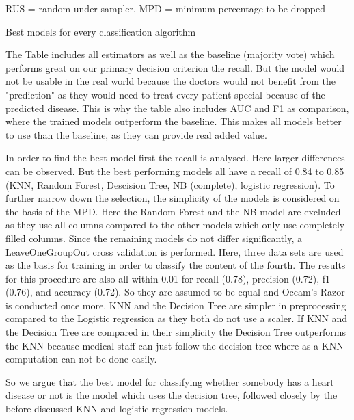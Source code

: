 \begin{table}[]
\begin{footnotesize}
		\begin{center}
			\centering
			RUS = random under sampler, MPD = minimum percentage to be dropped
		\end{center}
	\end{footnotesize}
	\caption{Best models for every classification algorithm}
	\label{table:modelresults}

\end{table}

The Table includes all estimators as well as the baseline (majority vote) which performs great on our primary decision criterion the recall. But the model would not be usable in the real world because the doctors would not benefit from the "prediction" as they would need to treat every patient special because of the predicted disease. This is why the table also includes AUC and F1 as comparison, where the trained models outperform the baseline. This makes all models better to use than the baseline, as they can provide real added value. 

In order to find the best model first the recall is analysed. Here larger differences can be observed. But the best performing models all have a recall of 0.84 to 0.85 (KNN, Random Forest, Descision Tree, NB (complete), logistic regression).  To further narrow down the selection, the simplicity of the models is considered on the basis of the MPD. Here the Random Forest and the NB model are excluded as they use all columns compared to the other models which only use completely filled columns. Since the remaining models do not differ significantly, a LeaveOneGroupOut cross validation is performed. Here, three data sets are used as the basis for training in order to classify the content of the fourth. The results for this procedure are also all within 0.01 for recall (0.78), precision (0.72), f1 (0.76), and accuracy (0.72). So they are assumed to be equal and Occam's Razor is conducted once more. KNN and the Decision Tree are simpler in preprocessing compared to the Logistic regression as they both do not use a scaler. If KNN and the Decision Tree are compared in their simplicity the Decision Tree outperforms the KNN because medical staff can just follow the decision tree where as a KNN computation can not be done easily. 

So we argue that the best model for classifying whether somebody has a heart disease or not is the model which uses the decision tree, followed closely by the before discussed KNN and logistic regression models.


